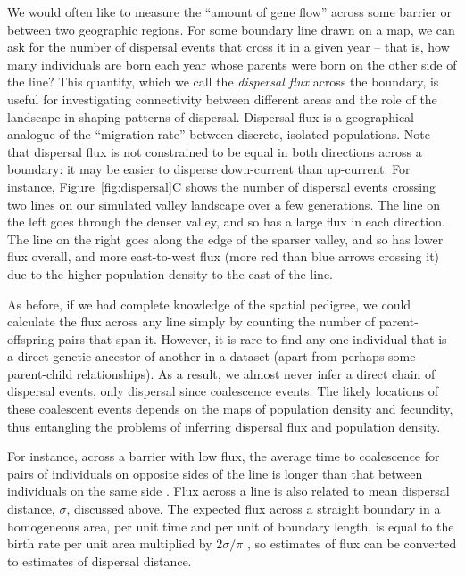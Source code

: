 \documentclass{ar-1col}
\renewcommand{\emph}[1]{{\textit{#1}}}
\begin{document}
We would often like to measure the ``amount of gene flow'' across some barrier
or between two geographic regions.
For some boundary line drawn on a map,
we can ask for the number of dispersal events that cross it in a given year -- 
that is, 
how many individuals are born each year whose parents
were born on the other side of the line?
This quantity, which we call the \emph{dispersal flux} across the boundary,
is useful for investigating connectivity between different areas
and the role of the landscape in shaping patterns of dispersal.
Dispersal flux is a geographical analogue of
the ``migration rate'' between discrete, isolated populations. 
Note that dispersal flux is not constrained to be equal in both directions across a boundary:
it may be easier to disperse down-current than up-current.
For instance, Figure~\ref{fig:dispersal}C
shows the number of dispersal events crossing two lines on our simulated valley landscape
over a few generations.
The line on the left goes through the denser valley, 
and so has a large flux in each direction.
The line on the right goes along the edge of the sparser valley,
and so has lower flux overall, and more east-to-west flux 
(more red than blue arrows crossing it)
due to the higher population density to the east of the line.

As before, if we had complete knowledge of the spatial pedigree,
we could calculate the flux across any line simply by counting the number of
parent-offspring pairs that span it.
However, it is rare to find any one individual
that is a direct genetic ancestor of another in a dataset
(apart from perhaps some parent-child relationships).
As a result, we almost never infer a direct chain of dispersal events,
only dispersal since coalescence events.
The likely locations of these coalescent events
depends on the maps of population density and fecundity,
thus entangling
the problems of inferring dispersal flux and population density.

For instance, across a barrier with low flux,
the average time to coalescence for pairs of individuals on opposite sides of the line
is longer than that between individuals on the same side \citep{bedassle,Duforet-Frebourg_Blum_2014,ringbauer2018estimating}.
Flux across a line is also related to mean dispersal distance, $\sigma$, discussed above.
The expected flux across a straight boundary in a homogeneous area,
per unit time and per unit of boundary length,
is equal to the birth rate per unit area multiplied by $2 \sigma / \pi$
\citep[where $\pi$ is the mathematical constant,][]{buffon1777},
so estimates of flux can be converted to estimates of dispersal distance.
\end{document}
